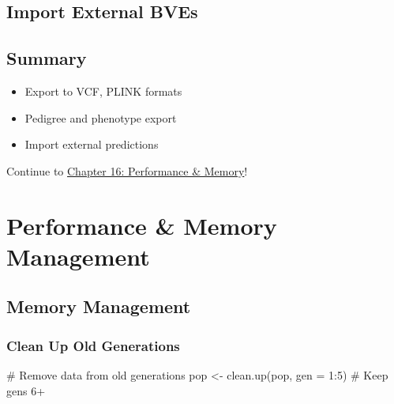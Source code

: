 \documentclass[
  letterpaper,
]{book}
\newenvironment{Shaded}{\begin{snugshade}}{\end{snugshade}}
\newcommand{\AttributeTok}[1]{\textcolor[rgb]{0.40,0.45,0.13}{#1}}
\newcommand{\CommentTok}[1]{\textcolor[rgb]{0.37,0.37,0.37}{#1}}
\newcommand{\DecValTok}[1]{\textcolor[rgb]{0.68,0.00,0.00}{#1}}
\newcommand{\FunctionTok}[1]{\textcolor[rgb]{0.28,0.35,0.67}{#1}}
\newcommand{\NormalTok}[1]{\textcolor[rgb]{0.00,0.23,0.31}{#1}}
\newcommand{\OtherTok}[1]{\textcolor[rgb]{0.00,0.23,0.31}{#1}}
\newcommand{\SpecialCharTok}[1]{\textcolor[rgb]{0.37,0.37,0.37}{#1}}
\newcommand{\StringTok}[1]{\textcolor[rgb]{0.13,0.47,0.30}{#1}}
\providecommand{\tightlist}{%
  \setlength{\itemsep}{0pt}\setlength{\parskip}{0pt}}
\begin{document}
\section{Import External BVEs}\label{import-external-bves}

\begin{Shaded}
\end{Shaded}

\section{Summary}\label{summary-14}

\begin{itemize}
\tightlist
\item
  Export to VCF, PLINK formats
\item
  Pedigree and phenotype export
\item
  Import external predictions
\end{itemize}

Continue to \href{16-performance-memory.qmd}{Chapter 16: Performance \&
Memory}!

\chapter{Performance \& Memory Management}\label{sec-performance-memory}

\section{Memory Management}\label{memory-management}

\subsection{Clean Up Old Generations}\label{clean-up-old-generations}

\begin{Shaded}
\begin{Highlighting}[]
\CommentTok{\# Remove data from old generations}
\NormalTok{pop }\OtherTok{\textless{}{-}} \FunctionTok{clean.up}\NormalTok{(pop, }\AttributeTok{gen =} \DecValTok{1}\SpecialCharTok{:}\DecValTok{5}\NormalTok{)  }\CommentTok{\# Keep gens 6+}
\end{Highlighting}
\end{Shaded}
\end{document}
